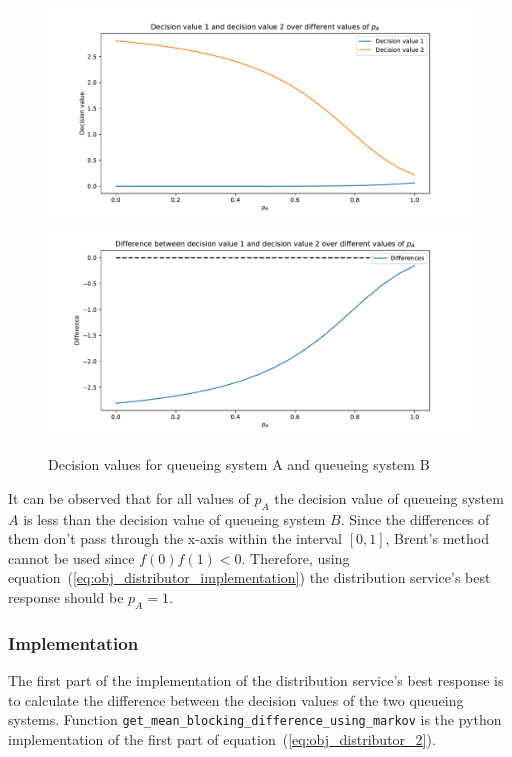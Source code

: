 \begin{figure}[H]
    \centering
    \includegraphics[width=\textwidth]{chapters/04_game_theoretic_model/img/brents_method/brent_method_special_case.pdf}
    \includegraphics[width=\textwidth]{chapters/04_game_theoretic_model/img/brents_method/brent_method_special_case_diffs.pdf}
    \caption{Decision values for queueing system A and queueing system B}
    \label{fig:brent_method_special_case}
\end{figure}

It can be observed that for all values of \(p_A\) the decision value of queueing
system \(A\) is less than the decision value of queueing system \(B\).
Since the differences of them don't pass through the x-axis within the interval
\([0,1]\), Brent's method cannot be used since \(f(0)f(1) < 0\).
Therefore, using equation~(\ref{eq:obj_distributor_implementation}) the
distribution service's best response should be \(p_A = 1\).

\subsubsection{Implementation}

The first part of the implementation of the distribution service's best
response is to calculate the difference between the decision values of the two
queueing systems.
Function \lstinline[style=pystyle]{get_mean_blocking_difference_using_markov}
is the python implementation of the first part of
equation~(\ref{eq:obj_distributor_2}).

